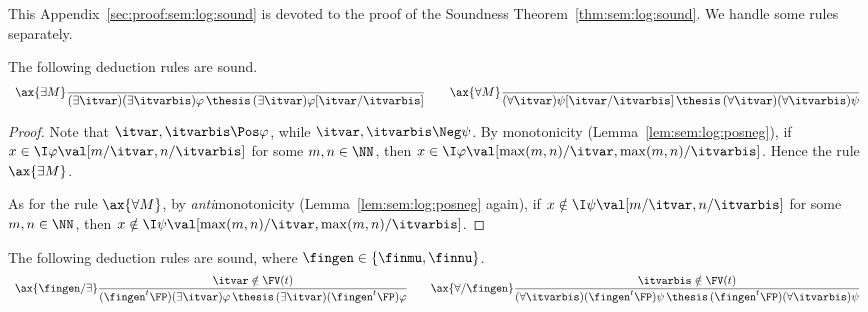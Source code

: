 This Appendix~\ref{sec:proof:sem:log:sound}
is devoted to the proof of the Soundness Theorem~\ref{thm:sem:log:sound}.
We handle some rules separately.



\begin{lemma}
\label{lem:proof:sem:log:sound:mergequant}
The following deduction rules are sound.
\[
\begin{array}{c}
%
\ax{\exists M}
\dfrac{}
  {(\exists \itvar)(\exists \itvarbis)\varphi
  \,\thesis\,
  (\exists \itvar)\varphi[\itvar / \itvarbis]}
%
\qquad
%
\ax{\forall M}
\dfrac{}
  {(\forall \itvar)\psi[\itvar / \itvarbis]
  \,\thesis\,
  (\forall \itvar)(\forall \itvarbis)\psi}
%
\end{array}
\]
\end{lemma}

\begin{proof}
Note that $\itvar, \itvarbis \Pos \varphi$,
while $\itvar, \itvarbis \Neg \psi$.
By monotonicity (Lemma~\ref{lem:sem:log:posneg}),
if $x \in \I\varphi\val[m / \itvar, n / \itvarbis]$
for some $m, n \in \NN$,
then $x \in \I\varphi\val[\max(m,n) / \itvar, \max(m,n) / \itvarbis]$.
Hence the rule $\ax{\exists M}$.

As for the rule $\ax{\forall M}$,
by \emph{anti}monotonicity
(Lemma~\ref{lem:sem:log:posneg} again),
if
$x \notin \I\psi\val[m / \itvar, n / \itvarbis]$
for some $m, n \in \NN$,
then 
$x \notin \I\psi\val[\max(m,n) / \itvar, \max(m,n) / \itvarbis]$.
\end{proof}




\begin{lemma}
\label{lem:proof:sem:log:sound:fixquant}
The following deduction rules are sound,
where $\fingen \in \{\finmu, \finnu\}$.
\[
\begin{array}{c}
%
\ax{\fingen/\exists}
\dfrac{\itvar \notin \FV(t)}
  {(\fingen^t \FP)(\exists \itvar)\varphi
  \,\thesis\,
  (\exists \itvar)(\fingen^t \FP)\varphi}
%
\qquad
%
\ax{\forall/\fingen}
\dfrac{\itvarbis \notin \FV(t)}
  {(\forall \itvarbis)(\fingen^t \FP)\psi
  \,\thesis\,
  (\fingen^t \FP)(\forall \itvarbis)\psi}
%
\end{array}
\]
\end{lemma}

